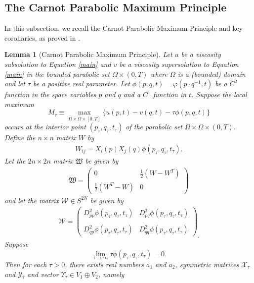 \documentclass[12pt]{amsart}
\newtheorem{lemma}[thm]{Lemma}
\theoremstyle{definition}
\theoremstyle{remark}
\numberwithin{equation}{section}
\begin{document}
\subsection{The Carnot Parabolic Maximum Principle}
In this subsection, we recall the Carnot Parabolic Maximum Principle and key corollaries, as proved in \cite{BM}.  
\begin{lemma}[Carnot Parabolic Maximum Principle]\label{cpmp}
Let $u$ be a viscosity subsolution to Equation \eqref{main} and $v$ be
a viscosity supersolution to Equation \eqref{main} in the bounded parabolic set $\Omega \times (0,T)$ where $\Omega$ is a (bounded) domain and let $\tau$ be a positive real parameter. Let $\phi(p,q,t)=\varphi(p\cdot q^{-1},t)$ be a $C^2$ function in the space variables $p$ and $q$ and a $C^1$ function in $t$.  
Suppose the local maximum 
\begin{equation}\label{Mdef}
M_\tau \equiv \max_{\overline{\Omega}\times \overline{\Omega}\times [0,T]}\{u(p,t)-v(q,t)-\tau\phi(p,q,t)\}
\end{equation}
 occurs at the interior point $(p_\tau, q_\tau, t_\tau)$ of the parabolic set $\Omega\times \Omega \times (0,T)$.
Define the $n \times n$ matrix $W$ by 
\begin{eqnarray*}
W_{ij}=X_i(p)X_j(q)\phi(p_\tau,q_\tau, t_\tau).
\end{eqnarray*}
Let the $2n \times 2n$ matrix $\mathfrak{W}$ be given by
\begin{eqnarray}
\mathfrak{W}=\begin{pmatrix}
    0  &  \frac{1}{2}(W-W^T)  \\
    \frac{1}{2}(W^T-W)   &  0
\end{pmatrix}
\end{eqnarray}
and let the matrix  $\mathcal{W}\in S^{2N}$ be given by 
\begin{eqnarray}\label{Adef}
\mathcal{W}=\begin{pmatrix}
  D^2_{pp}\phi(p_\tau,q_\tau, t_\tau)    &  D^2_{pq}\phi(p_\tau,q_\tau, t_\tau)  \\
   & \\
   D^2_{qp}\phi(p_\tau,q_\tau, t_\tau)   & D^2_{qq}\phi(p_\tau,q_\tau, t_\tau) 
\end{pmatrix}_.
\end{eqnarray}
Suppose $$\lim_{\tau \rightarrow \infty}\tau\phi(p_\tau,q_\tau, t_\tau)=0.$$ Then for each $\tau>0$, 
there exists  real numbers $a_1$ and $a_2$, symmetric matrices $\mathcal{X}_{\tau}$ and
$\mathcal{Y}_{\tau}$ and
vector $\Upsilon_{\tau} \in V_1 \oplus V_2$, namely 

\end{lemma}
\end{document}
